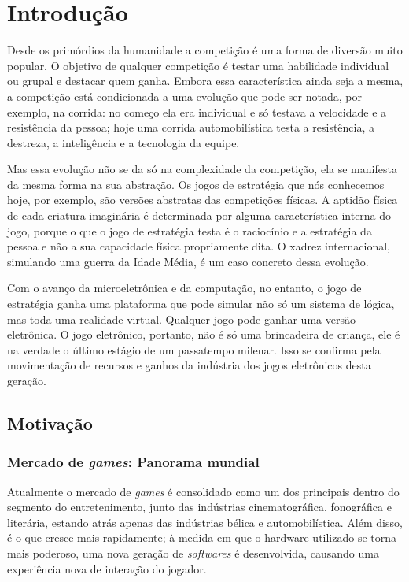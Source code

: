 \chapter{Introdução}
\label{cap:indtroducao}
%
Desde os primórdios da humanidade a competição é uma forma de diversão muito popular. O objetivo de qualquer competição é testar uma habilidade individual ou grupal e destacar quem ganha. Embora essa característica ainda seja a mesma, a competição está condicionada a uma evolução que pode ser notada, por exemplo, na corrida: no começo ela era individual e só testava a velocidade e a resistência da pessoa; hoje uma corrida automobilística testa a resistência, a destreza, a inteligência e a tecnologia da equipe.

Mas essa evolução não se da só na complexidade da competição, ela se manifesta da mesma forma na sua abstração. Os jogos de estratégia que nós conhecemos hoje, por exemplo, são versões abstratas das competições físicas. A aptidão física de cada criatura imaginária é determinada por alguma característica interna do jogo, porque o que o jogo de estratégia testa é o raciocínio e a estratégia da pessoa e não a sua capacidade física propriamente dita. O xadrez internacional, simulando uma guerra da Idade Média, é um caso concreto dessa evolução.

Com o avanço da microeletrônica e da computação, no entanto, o jogo de estratégia ganha uma plataforma que pode simular não só um sistema de lógica, mas toda uma realidade virtual. Qualquer jogo pode ganhar uma versão eletrônica. O jogo eletrônico, portanto, não é só uma brincadeira de criança, ele é na verdade o último estágio de um passatempo milenar. Isso se confirma pela movimentação de recursos e ganhos da indústria dos jogos eletrônicos desta geração.
%
%
\section{Motivação}
%
%
%
\subsection{Mercado de \textit{games}: Panorama mundial}
%
Atualmente o mercado de \textit{games} é consolidado como um dos principais dentro do segmento do entretenimento, junto das indústrias cinematográfica, fonográfica e literária, estando atrás apenas das indústrias bélica e automobilística. Além disso, é o que cresce mais rapidamente; à medida em que o hardware utilizado se torna mais poderoso, uma nova geração de \textit{softwares} é desenvolvida, causando uma experiência nova de interação do jogador.
 
